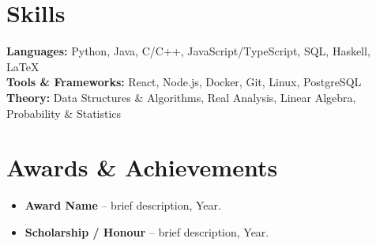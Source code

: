 \documentclass[11pt,a4paper]{article}
\begin{document}
\section{Skills}

\textbf{Languages:} Python, Java, C/C++, JavaScript/TypeScript, SQL, Haskell, \LaTeX\\
\textbf{Tools \& Frameworks:} React, Node.js, Docker, Git, Linux, PostgreSQL\\
\textbf{Theory:} Data Structures \& Algorithms, Real Analysis, Linear Algebra,
  Probability \& Statistics

\section{Awards \& Achievements}

\begin{itemize}
  \item \textbf{Award Name} -- brief description, Year.
  \item \textbf{Scholarship / Honour} -- brief description, Year.
\end{itemize}
\end{document}

